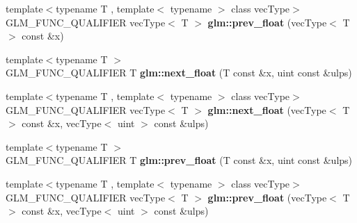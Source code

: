 \begin{DoxyCompactItemize}
\item 
\hypertarget{namespaceglm_a4a3004a3bd03071cb376a2c8ece474cd}{{\footnotesize template$<$typename T , template$<$ typename $>$ class vec\-Type$>$ }\\G\-L\-M\-\_\-\-F\-U\-N\-C\-\_\-\-Q\-U\-A\-L\-I\-F\-I\-E\-R vec\-Type$<$ T $>$ {\bfseries glm\-::prev\-\_\-float} (vec\-Type$<$ T $>$ const \&x)}\label{namespaceglm_a4a3004a3bd03071cb376a2c8ece474cd}

\item 
\hypertarget{namespaceglm_ae4ffae05b7502be722f522c04f7e42ac}{{\footnotesize template$<$typename T $>$ }\\G\-L\-M\-\_\-\-F\-U\-N\-C\-\_\-\-Q\-U\-A\-L\-I\-F\-I\-E\-R T {\bfseries glm\-::next\-\_\-float} (T const \&x, uint const \&ulps)}\label{namespaceglm_ae4ffae05b7502be722f522c04f7e42ac}

\item 
\hypertarget{namespaceglm_ad02e8fdb69b2d630274d1942c0fbda04}{{\footnotesize template$<$typename T , template$<$ typename $>$ class vec\-Type$>$ }\\G\-L\-M\-\_\-\-F\-U\-N\-C\-\_\-\-Q\-U\-A\-L\-I\-F\-I\-E\-R vec\-Type$<$ T $>$ {\bfseries glm\-::next\-\_\-float} (vec\-Type$<$ T $>$ const \&x, vec\-Type$<$ uint $>$ const \&ulps)}\label{namespaceglm_ad02e8fdb69b2d630274d1942c0fbda04}

\item 
\hypertarget{namespaceglm_a87ac8f75510274e112fe8512cfaa6935}{{\footnotesize template$<$typename T $>$ }\\G\-L\-M\-\_\-\-F\-U\-N\-C\-\_\-\-Q\-U\-A\-L\-I\-F\-I\-E\-R T {\bfseries glm\-::prev\-\_\-float} (T const \&x, uint const \&ulps)}\label{namespaceglm_a87ac8f75510274e112fe8512cfaa6935}

\item 
\hypertarget{namespaceglm_ac0d81c9494fb335267d7211acb0e9ea4}{{\footnotesize template$<$typename T , template$<$ typename $>$ class vec\-Type$>$ }\\G\-L\-M\-\_\-\-F\-U\-N\-C\-\_\-\-Q\-U\-A\-L\-I\-F\-I\-E\-R vec\-Type$<$ T $>$ {\bfseries glm\-::prev\-\_\-float} (vec\-Type$<$ T $>$ const \&x, vec\-Type$<$ uint $>$ const \&ulps)}\label{namespaceglm_ac0d81c9494fb335267d7211acb0e9ea4}


\end{DoxyCompactItemize}
